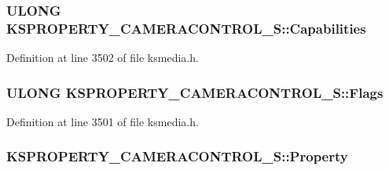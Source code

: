 \subsubsection[{\texorpdfstring{Capabilities}{Capabilities}}]{\setlength{\rightskip}{0pt plus 5cm}U\+L\+O\+NG K\+S\+P\+R\+O\+P\+E\+R\+T\+Y\+\_\+\+C\+A\+M\+E\+R\+A\+C\+O\+N\+T\+R\+O\+L\+\_\+\+S\+::\+Capabilities}\hypertarget{struct_k_s_p_r_o_p_e_r_t_y___c_a_m_e_r_a_c_o_n_t_r_o_l___s_a4c6d7e7f44d4f41bb1e65c19fe1e37b1}{}\label{struct_k_s_p_r_o_p_e_r_t_y___c_a_m_e_r_a_c_o_n_t_r_o_l___s_a4c6d7e7f44d4f41bb1e65c19fe1e37b1}


Definition at line 3502 of file ksmedia.\+h.

\subsubsection[{\texorpdfstring{Flags}{Flags}}]{\setlength{\rightskip}{0pt plus 5cm}U\+L\+O\+NG K\+S\+P\+R\+O\+P\+E\+R\+T\+Y\+\_\+\+C\+A\+M\+E\+R\+A\+C\+O\+N\+T\+R\+O\+L\+\_\+\+S\+::\+Flags}\hypertarget{struct_k_s_p_r_o_p_e_r_t_y___c_a_m_e_r_a_c_o_n_t_r_o_l___s_a61ff315d837bd4b4e534be698e4a300f}{}\label{struct_k_s_p_r_o_p_e_r_t_y___c_a_m_e_r_a_c_o_n_t_r_o_l___s_a61ff315d837bd4b4e534be698e4a300f}


Definition at line 3501 of file ksmedia.\+h.

\subsubsection[{\texorpdfstring{Property}{Property}}]{ K\+S\+P\+R\+O\+P\+E\+R\+T\+Y\+\_\+\+C\+A\+M\+E\+R\+A\+C\+O\+N\+T\+R\+O\+L\+\_\+\+S\+::\+Property}\hypertarget{struct_k_s_p_r_o_p_e_r_t_y___c_a_m_e_r_a_c_o_n_t_r_o_l___s_ab2d424ae09cadb233c54ea1a3ae0bfdc}{}\label{struct_k_s_p_r_o_p_e_r_t_y___c_a_m_e_r_a_c_o_n_t_r_o_l___s_ab2d424ae09cadb233c54ea1a3ae0bfdc}


